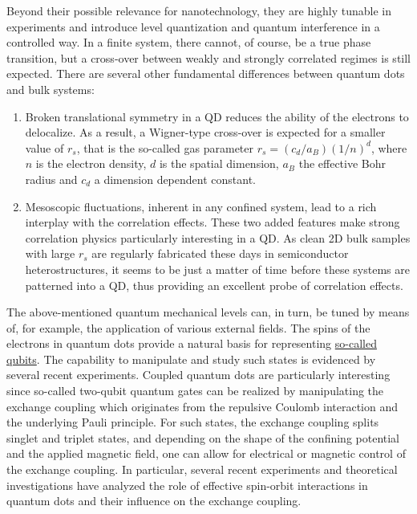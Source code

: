 \documentclass[%
oneside,                 %
final,                   %
10pt]{article}
\begin{document}
Beyond their possible relevance for
nanotechnology, they are highly tunable in experiments and introduce
level quantization and quantum interference in a controlled way. In a
finite system, there cannot, of course, be a true phase transition,
but a cross-over between weakly and strongly correlated regimes is
still expected. There are several other fundamental differences
between quantum dots and bulk systems: 
\begin{enumerate}
\item Broken translational symmetry in a QD reduces the ability of the electrons to delocalize. As a result, a Wigner-type cross-over is expected for a smaller value of $r_s$, that is the so-called gas parameter $r_s=(c_d/a_B)(1/n)^d$, where $n$ is the electron density, $d$ is the spatial dimension, $a_B$ the effective Bohr radius and $c_d$ a dimension dependent constant.

\item Mesoscopic fluctuations, inherent in any confined system, lead to a rich interplay with the correlation effects. These two added features make strong correlation physics particularly interesting in a QD. As clean 2D bulk samples with large $r_s$ are regularly fabricated these days in semiconductor heterostructures, it seems to be just a matter of time before these systems are patterned into a QD, thus providing an excellent probe of correlation effects.
\end{enumerate}

\noindent
The above-mentioned quantum mechanical levels can, in turn, be tuned
by means of, for example, the application of various external fields.
The spins of the electrons in quantum dots provide a natural basis for
representing \href{{https://journals.aps.org/pra/abstract/10.1103/PhysRevA.57.120}}{so-called qubits}. The capability to
manipulate and study such states is evidenced by several recent
experiments.  Coupled quantum dots are particularly
interesting since so-called two-qubit quantum gates can be realized by
manipulating the exchange coupling which originates from the repulsive
Coulomb interaction and the underlying Pauli principle.  For such
states, the exchange coupling splits singlet and triplet states, and
depending on the shape of the confining potential and the applied
magnetic field, one can allow for electrical or magnetic control of
the exchange coupling. In particular, several recent experiments and
theoretical investigations have analyzed the role of effective
spin-orbit interactions in quantum dots and their influence on the
exchange coupling.
\end{document}
